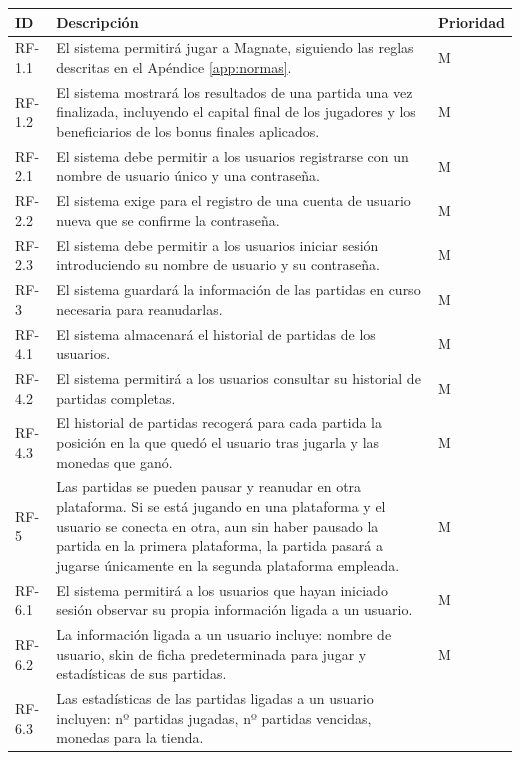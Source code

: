 \documentclass[11pt]{article}
\begin{document}
\begin{xltabular}{\textwidth}{|l|X|l|}
		\hline
		ID & Descripción & Prioridad \\
		\hline
		RF-1.1 & 
		El sistema permitirá jugar a Magnate, siguiendo las reglas descritas
		en el Apéndice \ref{app:normas}. &
		M \\
		\hline
		RF-1.2 &
		El sistema mostrará los resultados de una partida una vez finalizada, incluyendo el capital final de los jugadores y los beneficiarios de los bonus finales aplicados. &
		M \\
		\hline
		RF-2.1 &
		El sistema debe permitir a los usuarios registrarse con un nombre de usuario único y una contraseña. 
		& M \\
		\hline
		RF-2.2 &
		El sistema exige para el registro de una cuenta de usuario nueva que se confirme la contraseña.
		& M \\
		\hline
		RF-2.3 &
		El sistema debe permitir a los usuarios iniciar sesión introduciendo su nombre de usuario y su contraseña.
		& M \\
		\hline
		RF-3 &
		El sistema guardará la información de las partidas en curso necesaria
		para reanudarlas.
		& M \\
		\hline
		RF-4.1 &
		El sistema almacenará el historial de partidas de los usuarios.
		& M \\
		\hline
		RF-4.2 &
		El sistema permitirá a los usuarios consultar su historial de partidas completas.
		& M \\
		\hline
		RF-4.3 &
		El historial de partidas recogerá para cada partida la posición en
		la que quedó el usuario tras jugarla y las monedas que ganó.
		& M \\
		\hline
		RF-5 &
		Las partidas se pueden pausar y reanudar en otra plataforma. Si se está jugando en una plataforma y el usuario se conecta en otra, aun sin haber pausado la partida en la primera plataforma, la partida pasará a jugarse únicamente en la segunda plataforma empleada.
		& M \\
		\hline
		RF-6.1 &
		El sistema permitirá a los usuarios que hayan iniciado sesión observar su propia información ligada a un usuario.
		& M \\
		\hline
		RF-6.2 &
		La información ligada a un usuario incluye: nombre de usuario, skin de ficha predeterminada para jugar y estadísticas de sus partidas.
		& M \\
		\hline
		RF-6.3 &
		Las estadísticas de las partidas ligadas a un usuario incluyen: nº partidas jugadas, nº partidas vencidas, monedas para la tienda.

\end{xltabular}
\end{document}
